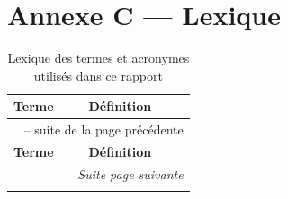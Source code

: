 \section{Annexe C — Lexique}

\begin{longtable}{|p{}|p{}|}
	\caption{Lexique des termes et acronymes utilisés dans ce rapport}
	\label{tab:annexe-glossaire} \\
	\hline
	\textbf{Terme} & \textbf{Définition} \\
	\hline
	\endfirsthead

	\multicolumn{2}{c}{\tablename\ \thetable{} -- suite de la page précédente} \\
	\hline
	\textbf{Terme} & \textbf{Définition} \\
	\hline
	\endhead

	\hline
	\multicolumn{2}{r}{\textit{Suite page suivante}} \\
	\endfoot

	\hline
	\endlastfoot


\end{longtable}
